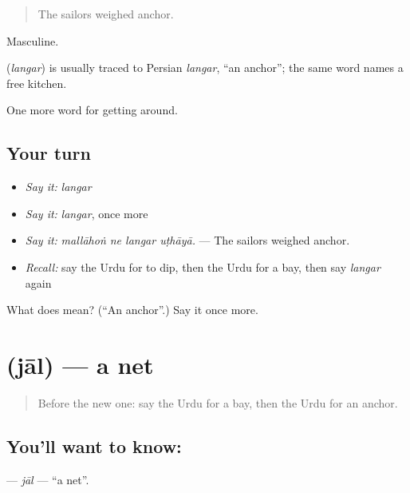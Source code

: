 \begin{quote}
The sailors weighed anchor.
\end{quote}

Masculine.

\begin{cousinweb}
\textbf{} (\emph{langar}) is usually traced to Persian \emph{langar}, \textquotedblleft{}an anchor\textquotedblright{}; the same word names a free kitchen.
\end{cousinweb}

\begin{grammarlens}[title={What you've built}]
One more word for getting around.
\end{grammarlens}

\subsection*{Your turn}
\begin{itemize}
\raggedright
  \item \emph{Say it:} \emph{langar}
  \item \emph{Say it:} \emph{langar}, once more
  \item \emph{Say it:} \emph{mallāhoṅ ne langar uṭhāyā.} — The sailors weighed anchor.
  \item \emph{Recall:} say the Urdu for to dip, then the Urdu for a bay, then say \emph{langar} again
\end{itemize}

\begin{tcolorbox}[breakable,colback=teal!4,colframe=teal!35!black,title={Before you move on}]
What does  mean? (\textquotedblleft{}An anchor\textquotedblright{}.) Say it once more.
\end{tcolorbox}
\section[\texorpdfstring{\ur{جال} (jāl)}{جال (jāl)}]{ (jāl) — a net}

\label{lesson:UR-C435-jal}



\begin{quote}
Before the new one: say the Urdu for a bay, then the Urdu for an anchor.
\end{quote}

\subsection*{You'll want to know: }
\textbf{} — \emph{jāl} — \textquotedblleft{}a net\textquotedblright{}.

